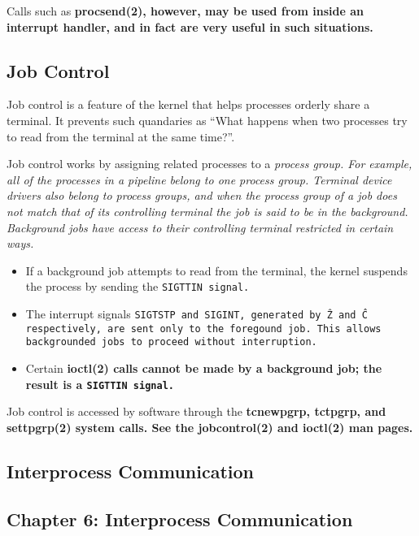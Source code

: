 \documentclass{report}
\begin{document}
Calls such as \bf procsend\rm(2), however, may be used from inside
an interrupt handler, and in fact are very useful in such situations.


\section{Job Control}

Job control is a feature of the kernel that
helps processes orderly share a terminal. It prevents such
quandaries as ``What happens when two processes try to read
from the terminal at the same time?''. 

Job control works by assigning related
processes to a \it process group\rm. For example, all of the
processes in a pipeline belong to one process group. Terminal
device drivers also belong to process groups, and when the
process group of a job does not match that of its 
\it controlling terminal \rm
the job is said to be in the  background.
Background jobs have access to their controlling terminal restricted in
certain ways.

\begin{itemize}
\item	If a background job attempts to read from the terminal, the
	kernel suspends the process by sending the \tt SIGTTIN \rm signal.

\item	The interrupt signals \tt SIGTSTP \rm and \tt SIGINT\rm,
	generated by \^Z and \^C respectively, are sent only to the
	foregound job. This allows backgrounded jobs to proceed without
	interruption.

\item	Certain \bf ioctl\rm(2) calls cannot be made by a background job;
	the result is a \tt SIGTTIN \rm signal.
\end{itemize}

Job control is accessed by software through the \bf tcnewpgrp\rm,
\bf tctpgrp, and \bf settpgrp\rm(2) system calls. 
See the \bf jobcontrol\rm(2) and \bf ioctl\rm(2) man pages.

%
%

\begin{latexonly}
\chapter{Interprocess Communication}
\end{latexonly}
\begin{htmlonly}
\chapter{Chapter 6:  Interprocess Communication}
\end{htmlonly}
\end{document}
